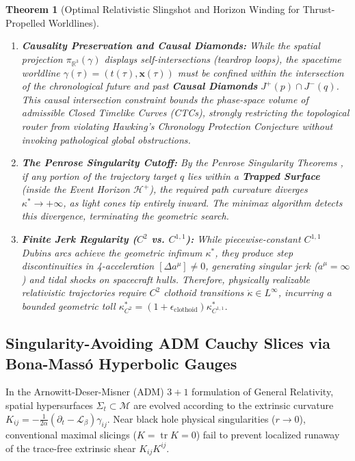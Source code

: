\documentclass[11pt,reqno]{amsart}
\newtheorem{theorem}{Theorem}[section]
\theoremstyle{definition}
\providecommand{\R}{\mathbb{R}}
\numberwithin{equation}{section}
\providecommand{\R}{\mathbb{R}}
\begin{document}
\begin{theorem}[Optimal Relativistic Slingshot and Horizon Winding for Thrust-Propelled Worldlines]
\begin{enumerate}
    \begin{equation}
    \kappa^*_{W=\pm 1} \approx \frac{M}{r_0^2 \sqrt{1 - 3M/r_0}} \ll \kappa^*_{W=0}
    \end{equation}
    achieving a reduction of peak structural stress exceeding $90\%$ compared to direct avoidance maneuvers.
    \item \textbf{Causality Preservation and Causal Diamonds:} While the spatial projection $\pi_{\R^3}(\gamma)$ displays self-intersections (teardrop loops), the spacetime worldline $\gamma(\tau) = (t(\tau), \mathbf{x}(\tau))$ must be confined within the intersection of the chronological future and past \textbf{Causal Diamonds} $J^+(p) \cap J^-(q)$. This causal intersection constraint bounds the phase-space volume of admissible Closed Timelike Curves (CTCs), strongly restricting the topological router from violating Hawking's Chronology Protection Conjecture \cite{hawking1992} without invoking pathological global obstructions.
    \item \textbf{The Penrose Singularity Cutoff:} By the Penrose Singularity Theorems \cite{penrose1965}, if any portion of the trajectory target $q$ lies within a \textbf{Trapped Surface} (inside the Event Horizon $\mathcal{H}^+$), the required path curvature diverges $\kappa^* \to +\infty$, as light cones tip entirely inward. The minimax algorithm detects this divergence, terminating the geometric search.
    \item \textbf{Finite Jerk Regularity ($C^2$ vs. $C^{1,1}$):} While piecewise-constant $C^{1,1}$ Dubins arcs achieve the geometric infimum $\kappa^*$, they produce step discontinuities in 4-acceleration $[\Delta a^\mu] \neq 0$, generating singular jerk ($\dot{a}^\mu = \infty$) and tidal shocks on spacecraft hulls. Therefore, physically realizable relativistic trajectories require $C^2$ clothoid transitions $\dot{\kappa} \in L^\infty$, incurring a bounded geometric toll $\kappa^*_{C^2} = (1 + \epsilon_{\mathrm{clothoid}}) \kappa^*_{C^{1,1}}$.
\end{enumerate}
\end{theorem}

\subsection{Singularity-Avoiding ADM Cauchy Slices via Bona-Mass\'o Hyperbolic Gauges}
\label{subsec:singularity_avoiding_adm}
In the Arnowitt-Deser-Misner (ADM) $3+1$ formulation of General Relativity, spatial hypersurfaces $\Sigma_t \subset \mathcal{M}$ are evolved according to the extrinsic curvature $K_{ij} = -\frac{1}{2\alpha} (\partial_t - \mathcal{L}_\beta) \gamma_{ij}$. Near black hole physical singularities ($r \to 0$), conventional maximal slicings ($K = \operatorname{tr} K = 0$) fail to prevent localized runaway of the trace-free extrinsic shear $K_{ij}K^{ij}$.
\end{document}
